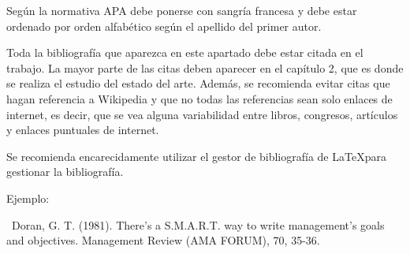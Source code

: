 
Según la normativa APA debe ponerse con sangría francesa y debe estar ordenado por orden alfabético según el apellido del primer autor.

Toda la bibliografía que aparezca en este apartado debe estar citada en el trabajo. La mayor parte de las citas deben aparecer en el capítulo 2, que es donde se realiza el estudio del estado del arte. Además, se recomienda evitar citas que hagan referencia a Wikipedia y que no todas las referencias sean solo enlaces de internet, es decir, que se vea alguna variabilidad entre libros, congresos, artículos y enlaces puntuales de internet.

Se recomienda encarecidamente utilizar el gestor de bibliografía de \LaTeX para gestionar la bibliografía.

Ejemplo:

\ Doran, G. T. (1981). There's a S.M.A.R.T. way to write management's goals and objectives. Management Review (AMA FORUM), 70, 35-36.